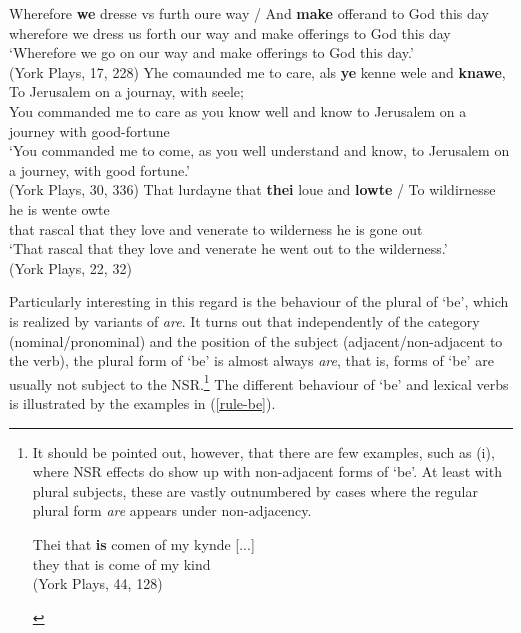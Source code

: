 \documentclass[output=paper]{langsci/langscibook}
\begin{document}
\ea
\label{york7}
\ea \gll Wherefore \textbf{we} dresse vs furth oure way / And \textbf{make} offerand to God this day \\
wherefore we dress us forth our way {} and make offerings to God this day\\
\glt `Wherefore we go on our way and make offerings to God this day.'\\
(York Plays, 17, 228)
\ex  \gll Yhe comaunded me to care, als \textbf{ye} kenne wele and \textbf{knawe}, To Jerusalem on a journay, with seele; \\
You commanded me to care as you\tief{[2pl]} know well and know to Jerusalem on a journey with good-fortune\\
\glt `You commanded me to come, as you well understand and know, to Jerusalem on a journey, with good fortune.' \\
(York Plays, 30, 336)
\ex \gll That lurdayne that \textbf{thei} loue and \textbf{lowte} / To wildirnesse he is wente owte\\
that rascal that they love and venerate {} to wilderness he is gone out\\
\glt `That rascal that they love and venerate he went out to the wilderness.'\\
(York Plays, 22, 32)
\z
\z

Particularly interesting in this regard is the behaviour of the plural of `be',
which is realized by variants of \emph{are}. It turns out that independently of
the category (nominal/pronominal) and the position of the subject
(adjacent\slash non-ad\-ja\-cent to the verb), the plural form of `be' is almost always
\emph{are}, that is, forms of `be' are usually not subject to the
\gls{NSR}.\footnote{It should be pointed out,
    however, that there are few examples, such as (i), where \gls{NSR} effects do show up with non-adjacent forms of `be'. At least
    with plural subjects, these are vastly outnumbered by cases where the
    regular plural form \emph{are} appears under non-adjacency.

    \begin{exe}
         \gll Thei that \textbf{is} comen of my kynde [...] \\
        they that is come of my kind \\
        \glt (York Plays, 44, 128)
    \end{exe}
} The different behaviour of `be' and lexical verbs is illustrated by the examples in (\ref{rule-be}).
\end{document}
